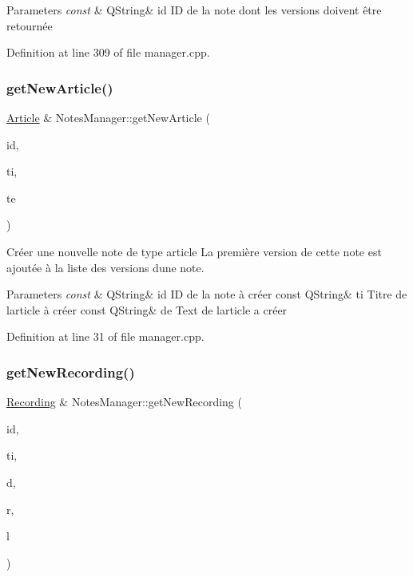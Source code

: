 \begin{DoxyParams}{Parameters}
{\em const} & Q\+String\& id ID de la note dont les versions doivent être retournée \\
\hline
\end{DoxyParams}


Definition at line 309 of file manager.\+cpp.

\mbox{\label{class_notes_manager_a44bfd4e7fe88b7f300a4be5589f92923}} 
\subsubsection{\texorpdfstring{get\+New\+Article()}{getNewArticle()}}
{\footnotesize\ttfamily \hyperlink{class_article}{Article} \& Notes\+Manager\+::get\+New\+Article (\begin{DoxyParamCaption}\item[{const Q\+String \&}]{id,  }\item[{const Q\+String \&}]{ti,  }\item[{const Q\+String \&}]{te }\end{DoxyParamCaption})}



Créer une nouvelle note de type article La première version de cette note est ajoutée à la liste des versions d\textquotesingle{}une note. 


\begin{DoxyParams}{Parameters}
{\em const} & Q\+String\& id ID de la note à créer const Q\+String\& ti Titre de l\textquotesingle{}article à créer const Q\+String\& de Text de l\textquotesingle{}article a créer \\
\hline
\end{DoxyParams}


Definition at line 31 of file manager.\+cpp.

\mbox{\label{class_notes_manager_a71d0bc2e2716a4e558705ea76e3ad491}} 
\subsubsection{\texorpdfstring{get\+New\+Recording()}{getNewRecording()}}
{\footnotesize\ttfamily \hyperlink{class_recording}{Recording} \& Notes\+Manager\+::get\+New\+Recording (\begin{DoxyParamCaption}\item[{const Q\+String \&}]{id,  }\item[{const Q\+String \&}]{ti,  }\item[{const Q\+String \&}]{d,  }\item[{E\+N\+U\+M\+::\+Recording\+Type}]{r,  }\item[{Q\+String}]{l }\end{DoxyParamCaption})}



